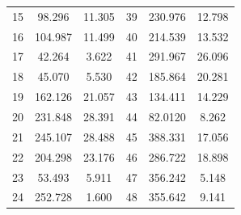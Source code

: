 \documentclass[mathematics,article,submit,pdftex,moreauthors]{Definitions/mdpi}
\begin{document}
\begin{table}[H]
\begin{tabularx}{\textwidth}{CCCCCC}
15 & 98.296 & 11.305 & 39 & 230.976 & 12.798 \\
16 & 104.987 & 11.499 & 40 & 214.539 & 13.532  \\
17 & 42.264 & 3.622 & 41 & 291.967 & 26.096  \\
18 & 45.070 & 5.530 & 42 & 185.864 & 20.281 \\
19 & 162.126 & 21.057 & 43 & 134.411 & 14.229 \\
20 & 231.848 & 28.391 & 44 & 82.0120 & 8.262 \\
21 & 245.107 & 28.488 & 45 & 388.331 & 17.056 \\
22 & 204.298 & 23.176 & 46 & 286.722 & 18.898 \\
23 & 53.493 & 5.911 & 47 & 356.242 & 5.148  \\
24 & 252.728 & 1.600 & 48 & 355.642 & 9.141  \\
\bottomrule
\end{tabularx}
\end{table}
\end{document}

